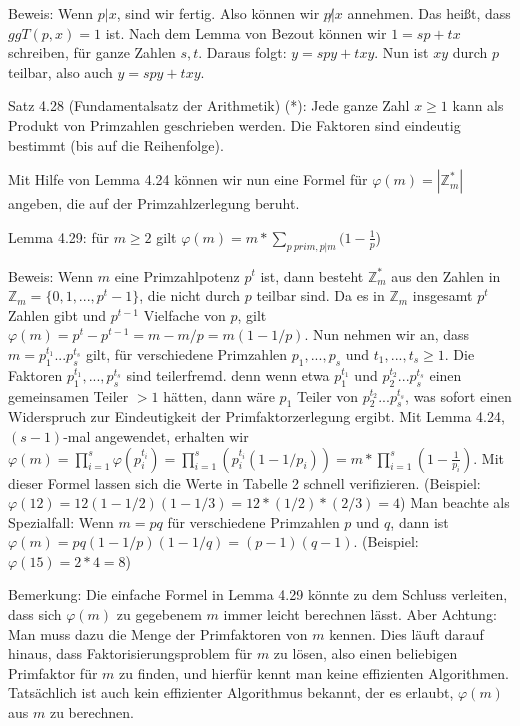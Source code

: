 \documentclass[a4paper]{article}
\begin{document}
\begin{multicols}{3}
Beweis: Wenn $p|x$, sind wir fertig. Also können wir $p\not|x$ annehmen. Das heißt, dass $ggT(p,x) = 1$ ist. Nach dem Lemma von Bezout können wir $1 =sp+tx$ schreiben, für ganze Zahlen $s,t$. Daraus folgt: $y=spy+txy$. Nun ist $xy$ durch $p$ teilbar, also auch $y=spy+txy$. 

Satz 4.28 (Fundamentalsatz der Arithmetik) (*): Jede ganze Zahl $x\geq 1$ kann als Produkt von Primzahlen geschrieben werden. Die Faktoren sind eindeutig bestimmt (bis auf die Reihenfolge).

Mit Hilfe von Lemma 4.24 können wir nun eine Formel für $\varphi(m) =|\mathbb{Z}^*_m|$ angeben, die auf der Primzahlzerlegung beruht.

Lemma 4.29: für $m\geq 2$ gilt $\varphi(m)=m*\sum_{p\ prim, p|m} (1-\frac{1}{p}$)

Beweis: Wenn $m$ eine Primzahlpotenz $p^t$ ist, dann besteht $\mathbb{Z}^*_m$ aus den Zahlen in $\mathbb{Z}_m=\{0,1,...,p^t-1\}$, die nicht durch $p$ teilbar sind. Da es in $\mathbb{Z}_m$ insgesamt $p^t$ Zahlen gibt und $p^{t-1}$ Vielfache von $p$, gilt $\varphi(m)=p^t-p^{t-1} =m-m/p=m(1-1/p)$. Nun nehmen wir an, dass $m=p^{t_1}_1 ...p^{t_s}_s$ gilt, für verschiedene Primzahlen $p_1,...,p_s$ und $t_1,...,t_s\geq 1$. Die Faktoren $p^{t_1}_1,...,p^{t_s}_s$ sind teilerfremd. denn wenn etwa $p^{t_1}_1$ und $p^{t_2}_2...p^{t_s}_s$ einen gemeinsamen Teiler $>1$ hätten, dann wäre $p_1$ Teiler von $p^{t_2}_2...p^{t_s}_s$, was sofort einen Widerspruch zur Eindeutigkeit der Primfaktorzerlegung ergibt. Mit Lemma 4.24, $(s-1)$-mal angewendet, erhalten wir $\varphi(m) =\prod^s_{i=1} \varphi(p^{t_i}_i) = \prod^s_{i=1} (p^{t_i}_i (1-1/p_i)) =m* \prod^s_{i=1} (1-\frac{1}{p_i})$. 
Mit dieser Formel lassen sich die Werte in Tabelle 2 schnell verifizieren. (Beispiel: $\varphi(12) = 12(1-1/2)(1-1/3) = 12*(1/2)*(2/3) = 4$) Man beachte als Spezialfall: Wenn $m=pq$ für verschiedene Primzahlen $p$ und $q$, dann ist $\varphi(m)=pq(1-1/p)(1-1/q) =(p-1)(q-1)$. (Beispiel: $\varphi(15) =2*4=8$)

Bemerkung: Die einfache Formel in Lemma 4.29 könnte zu dem Schluss verleiten, dass sich $\varphi(m)$ zu gegebenem $m$ immer leicht berechnen lässt. Aber Achtung: Man muss dazu die Menge der Primfaktoren von $m$ kennen. Dies läuft darauf hinaus, dass Faktorisierungsproblem für $m$ zu lösen, also einen beliebigen Primfaktor für $m$ zu finden, und hierfür kennt man keine effizienten Algorithmen. Tatsächlich ist auch
kein effizienter Algorithmus bekannt, der es erlaubt, $\varphi(m)$ aus $m$ zu berechnen.


\end{multicols}
\end{document}
